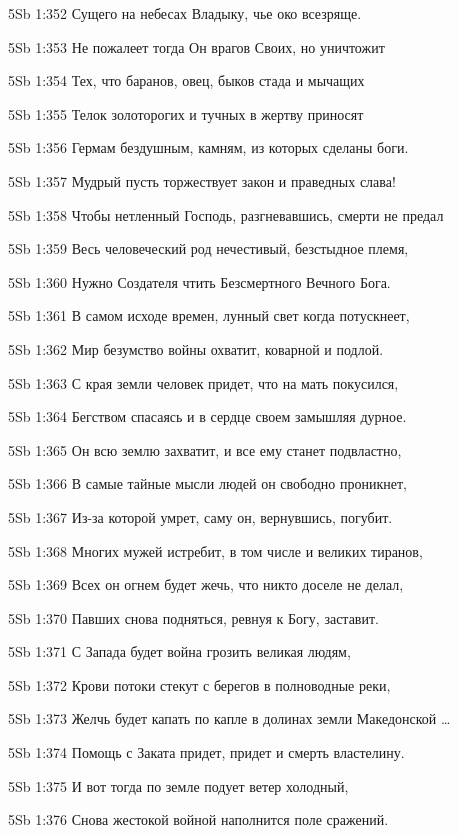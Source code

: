 \vs 5Sb 1:352 Сущего на небесах Владыку, чье око всезряще.

\vs 5Sb 1:353 Не пожалеет тогда Он врагов Своих, но уничтожит 

\vs 5Sb 1:354 Тех, что баранов, овец, быков стада и мычащих 

\vs 5Sb 1:355 Телок золоторогих и тучных в жертву приносят

\vs 5Sb 1:356 Гермам бездушным, камням, из которых сделаны боги.

\vs 5Sb 1:357 Мудрый пусть торжествует закон и праведных слава!

\vs 5Sb 1:358 Чтобы нетленный Господь, разгневавшись, смерти не предал

\vs 5Sb 1:359 Весь человеческий род нечестивый, безстыдное племя, 

\vs 5Sb 1:360 Нужно Создателя чтить  Безсмертного Вечного Бога.

\vs 5Sb 1:361 В самом исходе времен, лунный свет когда потускнеет, 

\vs 5Sb 1:362 Мир безумство войны охватит, коварной и подлой.

\vs 5Sb 1:363 С края земли человек придет, что на мать покусился, 

\vs 5Sb 1:364 Бегством спасаясь и в сердце своем замышляя дурное. 

\vs 5Sb 1:365 Он всю землю захватит, и все ему станет подвластно,

\vs 5Sb 1:366 В самые тайные мысли людей он свободно проникнет,

\vs 5Sb 1:367 Из-за которой умрет, саму он, вернувшись, погубит.

\vs 5Sb 1:368 Многих мужей истребит, в том числе и великих тиранов, 

\vs 5Sb 1:369 Всех он огнем будет жечь, что никто доселе не делал, 

\vs 5Sb 1:370 Павших снова подняться, ревнуя к Богу, заставит.

\vs 5Sb 1:371 С Запада будет война грозить великая людям, 

\vs 5Sb 1:372 Крови потоки стекут с берегов в полноводные реки, 

\vs 5Sb 1:373 Желчь будет капать по капле в долинах земли Македонской \ldots

\vs 5Sb 1:374 Помощь с Заката придет, придет и смерть властелину. 

\vs 5Sb 1:375 И вот тогда по земле подует ветер холодный,

\vs 5Sb 1:376 Снова жестокой войной наполнится поле сражений.

